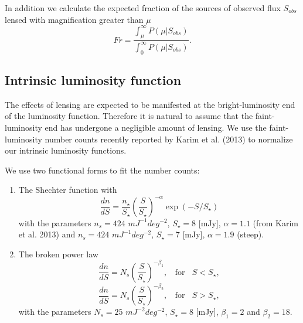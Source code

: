 \documentclass[12pt]{article}
\begin{document}
In addition we calculate the expected fraction of the sources of observed flux $S_{obs}$ lensed with magnification greater than $\mu$
\begin{equation}
Fr = \frac{\int_\mu^\infty P(\mu|S_{obs})}{\int_0^\infty P(\mu|S_{obs})}.
\end{equation}


 




\subsection{Intrinsic luminosity function}

The effects of lensing are expected to be manifested at the bright-luminosity end of the luminosity function. Therefore it is natural to assume that the faint-luminosity end has undergone a negligible amount of lensing.  
We use the faint-luminosity number counts recently reported by Karim et al. (2013) to normalize our intrinsic luminosity functions. 

We use two functional forms to fit the number counts: 
\begin{enumerate}
\item The Shechter function with 
\begin{equation}
\frac{dn}{dS} = \frac{n_\star}{S_\star}\left(\frac{S}{S_\star}\right)^{-\alpha}\exp\left(-S/S_\star\right)
\end{equation}
with the parameters $n_s = 424$ $mJ^{-1}deg^{-2}$, $S_\star = 8$ [mJy], $\alpha = 1.1$ (from Karim et al. 2013) and $n_s = 424$ $mJ^{-1}deg^{-2}$, $S_\star = 7$ [mJy], $\alpha = 1.9$ (steep).   
\item The broken power law 
\begin{equation}
\frac{dn}{dS} = N_s\left(\frac{S}{S_\star}\right)^{-\beta_1},~~~~\textrm{for}~~~~S<S_\star,
\end{equation} 
\begin{displaymath}
\frac{dn}{dS} = N_s\left(\frac{S}{S_\star}\right)^{-\beta_2},~~~~\textrm{for}~~~~S>S_\star,
\end{displaymath}
with the parameters $N_s = 25$ $mJ^{-2}deg^{-2}$, $S_\star = 8$ [mJy], $\beta_1 = 2$ and $\beta_2 = 18$. 
\end{enumerate}
\end{document}
